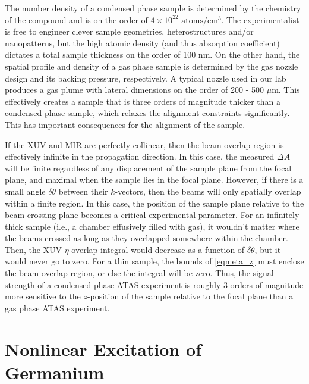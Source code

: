 The number density of a condensed phase sample is determined by the chemistry of the compound and is on the order of $4 \times 10^{22} \text{ atoms}/\text{cm}^3$. The experimentalist is free to engineer clever sample geometries, heterostructures and/or nanopatterns, but the high atomic density (and thus absorption coefficient) dictates a total sample thickness on the order of 100 nm. On the other hand, the spatial profile and density of a gas phase sample is determined by the gas nozzle design and its backing pressure, respectively. A typical nozzle used in our lab produces a gas plume with lateral dimensions on the order of 200 - 500 $\mu$m. This effectively creates a sample that is three orders of magnitude thicker than a condensed phase sample, which relaxes the alignment constraints significantly. This has important consequences for the alignment of the sample.

If the XUV and MIR are perfectly collinear, then the beam overlap region is effectively infinite in the propagation direction. In this case, the measured $\Delta A$ will be finite regardless of any displacement of the sample plane from the focal plane, and maximal when the sample lies in the focal plane. However, if there is a small angle $\delta \theta$ between their $k$-vectors, then the beams will only spatially overlap within a finite region. In this case, the position of the sample plane relative to the beam crossing plane becomes a critical experimental parameter. For an infinitely thick sample (i.e., a chamber effusively filled with gas), it wouldn't matter where the beams crossed as long as they overlapped somewhere within the chamber. Then, the XUV-$\eta$ overlap integral would decrease as a function of $\delta \theta$, but it would never go to zero. For a thin sample, the bounds of \cref{eqn:eta_z} must enclose the beam overlap region, or else the integral will be zero. Thus, the signal strength of a condensed phase ATAS experiment is roughly 3 orders of magnitude more sensitive to the $z$-position of the sample relative to the focal plane than a gas phase ATAS experiment.


\section{Nonlinear Excitation of Germanium}
\label{sec:nonlinear_excitation_germanium}

